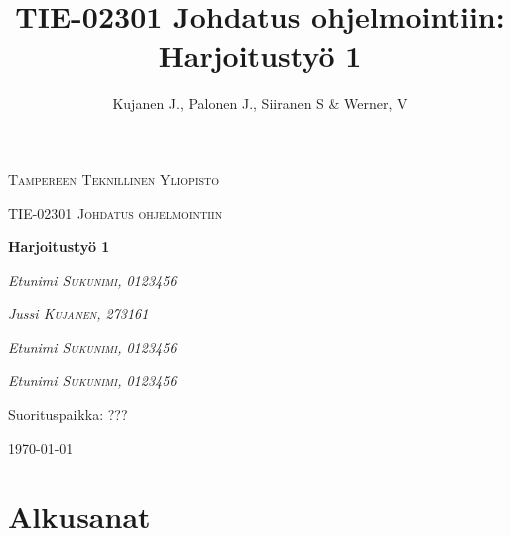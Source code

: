 \documentclass[12pt]{report} %
\title{TIE-02301 Johdatus ohjelmointiin: Harjoitustyö 1}
\author{Kujanen J., Palonen J., Siiranen S \& Werner, V}
\begin{document}

    \begin{titlepage}
        \centering
        {\scshape\LARGE Tampereen Teknillinen Yliopisto \par}
        \vspace{1cm}
        {\scshape\Large TIE-02301 Johdatus ohjelmointiin\par}
        \vspace{2.5cm}
        {\huge\bfseries Harjoitustyö 1 \par}
        \vspace{4cm}
        {\Large\itshape Etunimi \textsc{Sukunimi}, \textit{0123456}\par}
        {\Large\itshape Jussi \textsc{Kujanen}, \textit{273161}\par}
        {\Large\itshape Etunimi \textsc{Sukunimi}, \textit{0123456}\par}
        {\Large\itshape Etunimi \textsc{Sukunimi}, \textit{0123456}\par}
        
        \vfill
        Suorituspaikka: \textsc{???}
    
        \vfill
    
        {\large \today \par}
    \end{titlepage}

    
    \setcounter{page}{1}                    %
    


    {
        \hypersetup{linkcolor=black}
        \tableofcontents  %
    
    }
    


    
    \chapter*{Alkusanat}
    
\end{document}
